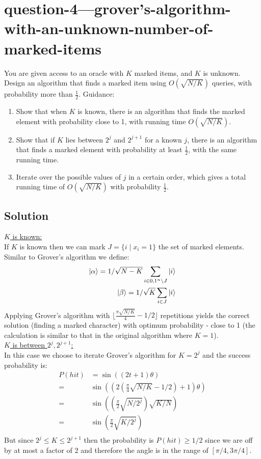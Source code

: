 \section*{question-4---grover’s-algorithm-with-an-unknown-number-of-marked-items}

You are given access to an oracle with $K$ marked items, and $K$ is unknown.
Design an algorithm that finds a marked item using $O\left(\sqrt{N/K}\right)$ queries, with probability more than $\frac{1}{2}$.
Guidance:
\begin{enumerate}
    \item Show that when $K$ is known, there is an algorithm that finds the marked element with probability close to 1, with running time $O\left(\sqrt{N/K}\right)$.
    \item Show that if $K$ lies between $2^j$ and $2^{j+1}$ for a known $j$, there is an algorithm that finds a marked element with probability at least $\frac{1}{2}$, with the same running time.
    \item Iterate over the possible values of $j$ in a certain order, which gives a total running time of $O\left(\sqrt{N/K}\right)$ with probability $\frac{1}{2}$.
\end{enumerate}

\subsection*{Solution}
\underline{$K$ is known:}\\
If $K$ is known then we can mark $J=\{i\mid x_i=1\}$ the set of marked elements.
Similar to Grover's algorithm we define:
\begin{align*}
    \ket{\alpha}=1/\sqrt{N-K}\sum_{i\in{0,1}^n\setminus J}\ket{i}\\
    \ket{\beta}=1/\sqrt{K}\sum_{i\in J}\ket{i}\\
\end{align*}
Applying Grover's algorithm with $\lfloor \frac{\pi\sqrt{N/K}}{4}-1/2\rfloor$ repetitions yields the correct solution (finding a marked character) with optimum probability - close to 1 (the calculation is similar to that in the original algorithm where $K=1$).\\

\underline{$K$ is between $2^j, 2^{j+1}$:}\\
In this case we choose to iterate Grover's algorithm for $K=2^j$ and the success probability is:
\begin{align*}
    P(hit)&=\sin((2t+1)\theta)\\
    =&\sin((2(\frac{\pi}{4}\sqrt{N/K}-1/2)+1)\theta)\\
    =&\sin((\frac{\pi}{2}\sqrt{N/2^j})\sqrt{K/N})\\
    =&\sin(\frac{\pi}{2}\sqrt{K/2^j})\\
\end{align*}
But since $2^j\le K\le 2^{j+1}$ then the probability is $P(hit)\ge 1/2$ since we are off by at most a factor of 2 and therefore the angle is in the range of $[\pi/4,3\pi/4]$.\\

